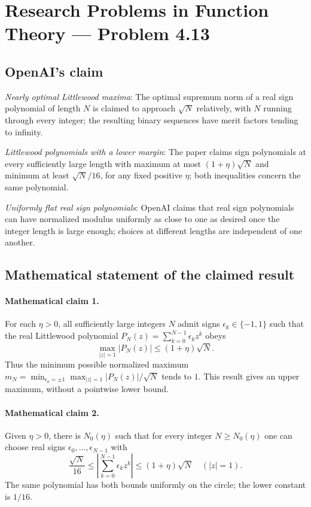 \documentclass[11pt]{article}
\begin{document}
\section*{Research Problems in Function Theory — Problem 4.13}

\subsection{OpenAI's claim}
\textit{Nearly optimal Littlewood maxima}: The optimal supremum norm of a real sign polynomial of length $N$ is claimed to approach $\sqrt N$ relatively, with $N$ running through every integer; the resulting binary sequences have merit factors tending to infinity.

\textit{Littlewood polynomials with a lower margin}: The paper claims sign polynomials at every sufficiently large length with maximum at most $(1+\eta)\sqrt N$ and minimum at least $\sqrt N/16$, for any fixed positive $\eta$; both inequalities concern the same polynomial.

\textit{Uniformly flat real sign polynomials}: OpenAI claims that real sign polynomials can have normalized modulus uniformly as close to one as desired once the integer length is large enough; choices at different lengths are independent of one another.

\subsection{Mathematical statement of the claimed result}
\paragraph{Mathematical claim 1.} For each $\eta>0$, all sufficiently large integers $N$ admit signs $\epsilon_k\in\{-1,1\}$ such that the real Littlewood polynomial $P_N(z)=\sum_{k=0}^{N-1}\epsilon_kz^k$ obeys \[\max_{|z|=1}|P_N(z)|\le(1+\eta)\sqrt N.\] Thus the minimum possible normalized maximum $m_N=\min_{\epsilon_k=\pm1}\max_{|z|=1}|P_N(z)|/\sqrt N$ tends to $1$. This result gives an upper maximum, without a pointwise lower bound.

\paragraph{Mathematical claim 2.} Given $\eta>0$, there is $N_0(\eta)$ such that for every integer $N\ge N_0(\eta)$ one can choose real signs $\epsilon_0,\ldots,\epsilon_{N-1}$ with \[\frac{\sqrt N}{16}\le\left|\sum_{k=0}^{N-1}\epsilon_kz^k\right|\le(1+\eta)\sqrt N\quad(|z|=1).\] The same polynomial has both bounds uniformly on the circle; the lower constant is $1/16$.
\end{document}
